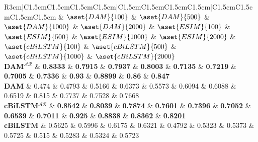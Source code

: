 
\begin{tabular}{R{3cm}|C{1.5cm}C{1.5cm}C{1.5cm}C{1.5cm}|C{1.5cm}C{1.5cm}C{1.5cm}C{1.5cm}|C{1.5cm}C{1.5cm}C{1.5cm}C{1.5cm}}
\toprule
{} & $\aset{DAM}{100}$ & $\aset{DAM}{500}$ & $\aset{DAM}{1000}$ & $\aset{DAM}{2000}$ & $\aset{ESIM}{100}$ & $\aset{ESIM}{500}$ & $\aset{ESIM}{1000}$ & $\aset{ESIM}{2000}$ & $\aset{cBiLSTM}{100}$ & $\aset{cBiLSTM}{500}$ & $\aset{cBiLSTM}{1000}$ & $\aset{cBiLSTM}{2000}$ \\ 
\midrule
{\bf {\bf DAM}$^{\mathcal{AR}}$} & {\bf 0.8333} & {\bf 0.7915} & {\bf 0.7937} & {\bf 0.8003} & {\bf 0.7135} & {\bf 0.7219} & {\bf 0.7005} & {\bf 0.7336} & {\bf 0.93} & {\bf 0.8899} & {\bf 0.86} & {\bf 0.847} \\ 
{\bf DAM} & 0.474 & 0.4793 & 0.5166 & 0.6373 & 0.5573 & 0.6094 & 0.6088 & 0.6519 & 0.815 & 0.7737 & 0.7528 & 0.7668 \\ 

\midrule
{\bf {\bf cBiLSTM}$^{\mathcal{AR}}$} & {\bf 0.8542} & {\bf 0.8039} & {\bf 0.7874} & {\bf 0.7601} & {\bf 0.7396} & {\bf 0.7052} & {\bf 0.6539} & {\bf 0.7011} & {\bf 0.925} & {\bf 0.8838} & {\bf 0.8362} & {\bf 0.8201} \\ 
{\bf cBiLSTM} & 0.5625 & 0.5996 & 0.6175 & 0.6321 & 0.4792 & 0.5323 & 0.5373 & 0.5725 & 0.515 & 0.5283 & 0.5324 & 0.5723 \\ 

\bottomrule
\end{tabular}
